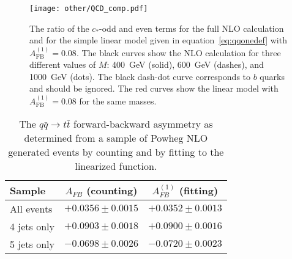 \begin{figure}[hbt]
  \begin{center}
    \texttt{[image: other/QCD\_comp.pdf]}
  \caption{\small The ratio of the $c_*$-odd and even terms for the full NLO calculation and for the simple linear model given in equation~\ref{eq:qqonedef} with $A_\mathrm{FB}^{(1)} = 0.08$.  The black curves show the NLO calculation for three different values of $M$: 400~GeV (solid), 600~GeV (dashes), and 1000~GeV (dots).  The black dash-dot curve corresponds to $b$ quarks and should be ignored.  The red curves show the linear model with $A_\mathrm{FB}^{(1)} = 0.08$ for the same masses.}
    \label{fig:qcd_comp}
  \end{center}
\end{figure}

\begin{table}[hbt]
\begin{center}
\caption{\small \label{tab:afb_counting_fitting} The $q\bar q\to t\bar t$ forward-backward asymmetry as determined from a sample of Powheg NLO generated events by counting and by fitting to the linearized function.}
\vspace{3pt}
\begin{tabular}{|l|cc|}\hline
 Sample      & $A_{FB}$ (counting) & $A_{FB}^{(1)}$ (fitting) \\ \hline
All events   & $+0.0356\pm0.0015$  & $+0.0352\pm0.0013$       \\ 
4 jets only  & $+0.0903\pm0.0018$  & $+0.0900\pm0.0016$       \\ 
5 jets only  & $-0.0698\pm0.0026$  & $-0.0720\pm0.0023$       \\ 
\hline
\end{tabular}
\end{center}
\end{table}


